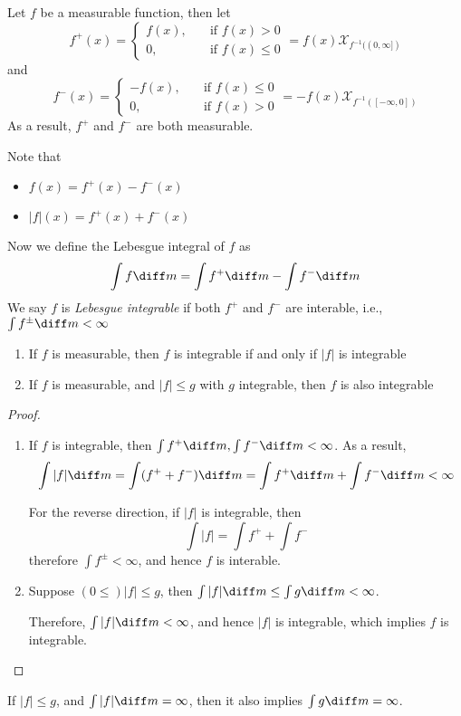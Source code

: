 \begin{definition}
Let $f$ be a measurable function, then let
\[
f^+(x) = \left\{
\begin{aligned}
f(x),&\quad\text{if $f(x)>0$}\\
0,&\quad\text{if $f(x)\le0$}
\end{aligned}
\right.
=
f(x)\mathcal{X}_{f^{-1}((0,\infty])}
\]
and
\[
f^-(x) = \left\{
\begin{aligned}
-f(x),&\quad\text{if $f(x)\le0$}\\
0,&\quad\text{if $f(x)>0$}
\end{aligned}
\right.
=
-f(x)\mathcal{X}_{f^{-1}([-\infty,0])}
\]
As a result, $f^+$ and $f^-$ are both measurable.

Note that
\begin{itemize}
\item
$f(x) = f^+(x) - f^-(x)$
\item
$|f|(x) = f^+(x)+f^-(x)$
\end{itemize}
Now we define the Lebesgue integral of $f$ as
\[
\int f\diff m = \int f^+\diff m - \int f^-\diff m
\]
We say $f$ is \emph{Lebesgue integrable} if both $f^+$ and $f^-$ are interable, i.e., $\int f^{\pm}\diff m<\infty$
\end{definition}

\begin{proposition}
\begin{enumerate}
\item
If $f$ is measurable, then $f$ is integrable if and only if $|f|$ is integrable
\item
If $f$ is measurable, and $|f|\le g$ with $g$ integrable, then $f$ is also integrable
\end{enumerate}
\end{proposition}
\begin{proof}
\begin{enumerate}
\item
If $f$ is integrable, then $\int f^+\diff m,\int f^-\diff m<\infty$.
As a result,
\[
\int|f|\diff m = \int(f^++f^-)\diff m=\int f^+\diff m+\int f^-\diff m
<\infty
\]

For the reverse direction, if $|f|$ is integrable, then 
\[
\int|f| = \int f^++\int f^-
\]
therefore $\int f^{\pm}<\infty$, and hence $f$ is interable.
\item
Suppose $(0\le )|f|\le g$, then $\int|f|\diff m\le \int g\diff m<\infty$.

Therefore, $\int|f|\diff m<\infty$, and hence $|f|$ is integrable, which implies $f$ is integrable.
\end{enumerate}
\end{proof}

\begin{remark}
If $|f|\le g$, and $\int|f|\diff m=\infty$, then it also implies $\int g\diff m=\infty$.
\end{remark}












